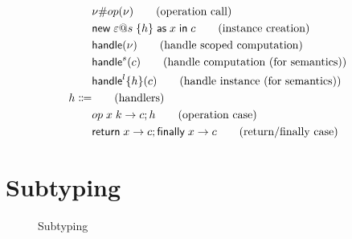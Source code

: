 {\begin{figure}
{\begin{minipage}{14 cm}
\begin{align*}
									& \nu \# op(\nu)							\tag{operation call} \\
									& \mathsf{new} \; \varepsilon @ s \; \{ h \} \; \mathsf{as} \; x \;\mathsf{in}\; c		\tag{instance creation} \\
									& \mathsf{handle} ( \nu )										\tag{handle scoped computation} \\
									& \mathsf{handle}^{s} ( c )								\tag{handle computation (for semantics)} \\
									& \mathsf{handle}^{l} \{ h \} ( c )	\tag{handle instance (for semantics)} \\
	h \Coloneqq 		&															\tag{handlers} \\
									& op \; x \; k \rightarrow c ; h	\tag{operation case} \\
									& \mathsf{return} \; x \rightarrow c ; \mathsf{finally} \; x \rightarrow c			\tag{return/finally case} \\
\end{align*}
\label{fig:syntax-calc}
\end{minipage}
}
\end{figure}

\section{Subtyping}
\begin{figure}
\caption{Subtyping}
\centering
{}
\end{figure}

}
